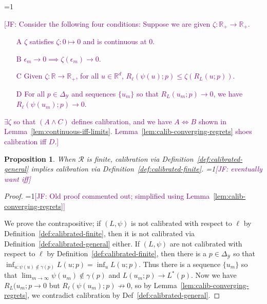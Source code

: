 \documentclass{article}
\newcommand{\Comments}{1}
\newcommand{\mynote}[2]{\ifnum\Comments=1\textcolor{#1}{#2}\fi}
\newcommand{\jessie}[1]{\mynote{purple}{[JF: #1]}}
\newcommand{\reals}{\mathbb{R}}
\newcommand{\simplex}{\Delta_\Y}
\newcommand{\R}{\mathcal{R}}
\newcommand{\Y}{\mathcal{Y}}
\newcommand{\risk}[1]{#1^*}
\newtheorem{proposition}{Proposition}
\begin{document}
\jessie{Consider the following four conditions: Suppose we are given $\zeta:\reals_+ \to \reals_+$.
\begin{enumerate}
	\item [A] $\zeta$ satisfies $\zeta : 0 \mapsto 0$ and is continuous at $0$.
	\item [B] $\epsilon_m \to 0 \implies \zeta(\epsilon_m) \to 0$.
	\item [C] Given $\zeta:\reals \to \reals_+$, for all $u \in \reals^d$, $R_\ell(\psi(u); p) \leq \zeta(R_L(u;p))$.
	\item [D] For all $p \in \simplex$ and sequences $\{u_m\}$ so that $R_L(u_m; p) \to 0$, we have $R_\ell(\psi(u_m); p) \to 0$.
\end{enumerate}
$\exists \zeta$ so that $(A \wedge C)$ defines calibration, and we have $A \iff B$ shown in Lemma~\ref{lem:continuous-iff-limits}.  Lemma~\ref{lem:calib-converging-regrets} shoes calibration iff $D$.}

\begin{proposition}
	When $\R$ is finite, calibration via Definition~\ref{def:calibrated-general} implies calibration via Definition~\ref{def:calibrated-finite}.
	\jessie{eventually want iff}
\end{proposition}
\begin{proof}
	\jessie{Old proof commented out; simplified using Lemma~\ref{lem:calib-converging-regrets}}

	We prove the contrapositive; if $(L, \psi)$ is not calibrated with respect to $\ell$ by Definition~\ref{def:calibrated-finite}, then it is not calibrated via Definition~\ref{def:calibrated-general} either.
	If $(L, \psi)$ are not calibrated with respect to $\ell$ by Definition~\ref{def:calibrated-finite}, then there is a $p \in \simplex$ so that $\inf_{u : \psi(u) \not \in \gamma(p)} L(u;p) = \inf_u L(u; p)$.
	Thus there is a sequence $\{u_m\}$ so that $\lim_{m \to \infty} \psi(u_m) \not \in \gamma(p)$ and $L(u_m; p) \to \risk{L}(p)$.  
	Now we have $R_L(u_m; p \to 0$ but $R_\ell(\psi(u_m); p) \not \to 0$, so by Lemma~\ref{lem:calib-converging-regrets}, we contradict calibration by Def~\ref{def:calibrated-general}.

%	
%	
		
	
\end{proof}
\end{document}
